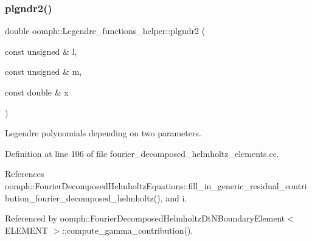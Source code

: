 \subsubsection{\texorpdfstring{plgndr2()}{plgndr2()}}
{\footnotesize\ttfamily double oomph\+::\+Legendre\+\_\+functions\+\_\+helper\+::plgndr2 (\begin{DoxyParamCaption}\item[{const unsigned \&}]{l,  }\item[{const unsigned \&}]{m,  }\item[{const double \&}]{x }\end{DoxyParamCaption})}



Legendre polynomials depending on two parameters. 



Definition at line 106 of file fourier\+\_\+decomposed\+\_\+helmholtz\+\_\+elements.\+cc.



References oomph\+::\+Fourier\+Decomposed\+Helmholtz\+Equations\+::fill\+\_\+in\+\_\+generic\+\_\+residual\+\_\+contribution\+\_\+fourier\+\_\+decomposed\+\_\+helmholtz(), and i.



Referenced by oomph\+::\+Fourier\+Decomposed\+Helmholtz\+Dt\+N\+Boundary\+Element$<$ E\+L\+E\+M\+E\+N\+T $>$\+::compute\+\_\+gamma\+\_\+contribution().

